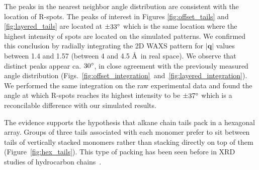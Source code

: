 \documentclass[journal=jpcbfk,manusciprt=article]{achemso}
\begin{document}
  The peaks in the nearest neighbor angle distribution are consistent with the
  location of R-spots. The peaks of interest in Figures \ref{fig:offset_tails}
  and \ref{fig:layered_tails} are located at $\pm 33 \degree$ which is the same
  location where the highest intensity of spots are located on the simulated
  patterns. We confirmed this conclusion by radially integrating the 2D WAXS
  pattern for $\left|\mathbf{q}\right|$ values between 1.4 and 1.57 (between 4
  and 4.5 \AA~in real space). We observe that distinct peaks appear ca. $30
  \degree$, in close agreement with the previously measured angle distribution
  (Figs.~\ref{fig:offset_integration}~and~\ref{fig:layered_integration}). We
  performed the same integration on the raw experimental data and found the angle
  at which R-spots reaches its highest intensity to be $\pm 37 \degree$ which
  is a reconcilable difference with our simulated results.

  The evidence supports the hypothesis that alkane chain tails pack in a
  hexagonal array. Groups of three tails associated with each monomer prefer to
  sit between tails of vertically stacked monomers rather than stacking directly
  on top of them (Figure~\ref{fig:hex_tails}). This type of packing has been seen
  before in XRD studies of hydrocarbon chains~\cite{small_lateral_1984}.
\end{document}
